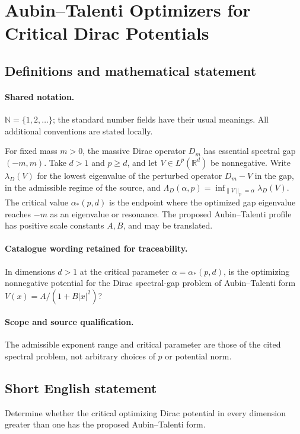 \documentclass[11pt]{article}
\begin{document}
\section{Aubin–Talenti Optimizers for Critical Dirac Potentials}\label{statement}

\subsection{Definitions and mathematical statement}

\paragraph{Shared notation.}$\mathbb N=\{1,2,\ldots\}$; the standard number fields have their usual meanings. All additional conventions are stated locally.


For fixed mass $m>0$, the massive Dirac operator $D_m$ has essential spectral gap $(-m,m)$. Take $d>1$ and $p\geq d$, and let $V\in L^p(\mathbb R^d)$ be nonnegative. Write $\lambda_D(V)$ for the lowest eigenvalue of the perturbed operator $D_m-V$ in the gap, in the admissible regime of the source, and $\Lambda_D(\alpha,p)=\inf_{\|V\|_p=\alpha}\lambda_D(V)$. The critical value $\alpha_*(p,d)$ is the endpoint where the optimized gap eigenvalue reaches $-m$ as an eigenvalue or resonance. The proposed Aubin--Talenti profile has positive scale constants $A,B$, and may be translated.

\paragraph{Catalogue wording retained for traceability.}
In dimensions $d>1$ at the critical parameter $\alpha=\alpha_*(p,d)$, is the optimizing nonnegative potential for the Dirac spectral-gap problem of Aubin–Talenti form $V(x)=A/(1+B|x|^2)$?

\paragraph{Scope and source qualification.}The admissible exponent range and critical parameter are those of the cited spectral problem, not arbitrary choices of $p$ or potential norm.
\subsection{Short English statement}
Determine whether the critical optimizing Dirac potential in every dimension greater than one has the proposed Aubin--Talenti form.
\end{document}
